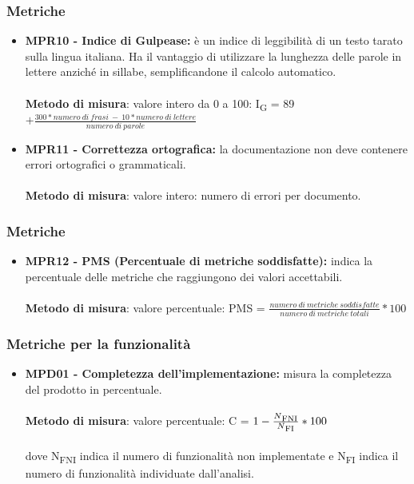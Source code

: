 \subsubsection{Metriche}
\begin{itemize}
    \item \textbf{MPR10 - Indice di Gulpease:}  è un indice di leggibilità di un testo tarato sulla lingua italiana. Ha il vantaggio di utilizzare la lunghezza delle parole in lettere anziché in sillabe, semplificandone il calcolo automatico.\\
    \\\textbf{Metodo di misura}: valore intero da 0 a 100: I\textsubscript{G} = 89 $+ \frac{300*numero \ di \ frasi \ - \ 10*numero \ di \ lettere}{numero \ di \ parole}$
    \item \textbf{MPR11 - Correttezza ortografica:}  la documentazione non deve contenere errori ortografici o grammaticali.\\
    \\\textbf{Metodo di misura}: valore intero: numero di errori per documento.
\end{itemize}

\subsubsection{Metriche}
\begin{itemize}
    \item \textbf{MPR12 - PMS (Percentuale di metriche soddisfatte):} indica la percentuale delle metriche che raggiungono dei valori accettabili.\\
    \\\textbf{Metodo di misura}: valore percentuale: PMS = $\frac{numero \ di \ metriche \ soddisfatte}{numero \ di \ metriche \ totali} * 100$ 
\end{itemize}


\subsubsection{Metriche per la funzionalit\`a}
\begin{itemize}
    \item \textbf{MPD01 - Completezza dell'implementazione:} misura la completezza del prodotto in percentuale.\\
    \\\textbf{Metodo di misura}: valore percentuale: C = $1-\frac{N\textsubscript{FNI}}{N\textsubscript{FI}}*100$ \\
    \\dove N\textsubscript{FNI} indica il numero di funzionalità non implementate e N\textsubscript{FI} indica il numero di funzionalità 
    individuate dall'analisi.
\end{itemize}

